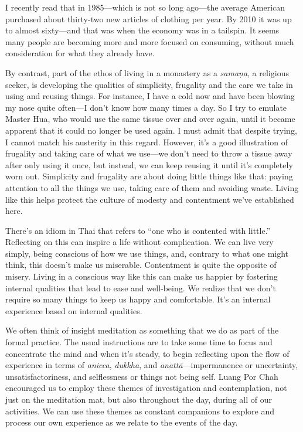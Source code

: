 
I recently read that in 1985---which is not so long ago---the average 
American purchased about thirty-two new articles of clothing per year. 
By 2010 it was up to almost sixty---and that was when the economy was 
in a tailspin. It seems many people are becoming more and more focused 
on consuming, without much consideration for what they already have.

By contrast, part of the ethos of living in a monastery as a 
\emph{samaṇa}, a religious seeker, is developing the qualities of 
simplicity, frugality and the care we take in using and reusing things. 
For instance, I have a cold now and have been blowing my nose quite 
often---I don't know how many times a day. So I try to emulate Master 
Hua, who would use the same tissue over and over again, until it became 
apparent that it could no longer be used again. I must admit that 
despite trying, I cannot match his austerity in this regard. However, 
it's a good illustration of frugality and taking care of what we 
use---we don't need to throw a tissue away after only using it once, 
but instead, we can keep reusing it until it's completely worn out. 
Simplicity and frugality are about doing little things like that: 
paying attention to all the things we use, taking care of them and 
avoiding waste. Living like this helps protect the culture of modesty 
and contentment we've established here.

There's an idiom in Thai that refers to ``one who is contented with
little.'' Reflecting on this can inspire a life \mbox{without}
complication.  We can live very simply, being conscious of how we use
things, and, contrary to what one might think, this doesn't make us
miserable.  Contentment is quite the opposite of misery. Living in a
conscious way like this can make us happier by fostering internal
qualities that lead to ease and well-being. We realize that we don't
require so many things to keep us happy and comfortable. It's an
internal experience based on internal qualities.


We often think of insight meditation as something that we do as part of 
the formal practice. The usual instructions are to take some time to 
focus and concentrate the mind and when it's steady, to begin 
reflecting upon the flow of experience in terms of \emph{anicca}, 
\emph{dukkha}, and \emph{anattā}---impermanence or uncertainty, 
unsatisfactoriness, and selflessness or things not being self. Luang 
Por Chah encouraged us to employ these themes of investigation and 
contemplation, not just on the meditation mat, but also throughout the 
day, during all of our activities. We can use these themes as constant 
companions to explore and process our own experience as we relate to 
the events of the day.

